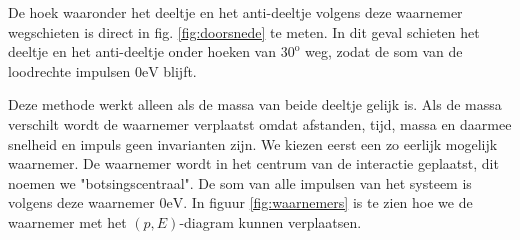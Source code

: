De hoek waaronder het deeltje en het anti-deeltje volgens deze waarnemer wegschieten is direct in fig. \ref{fig:doorsnede} te meten. In dit geval schieten het deeltje en het anti-deeltje onder hoeken van $30^{\mathrm{o}}$ weg, zodat de som van de loodrechte impulsen $0\mathrm{eV}$ blijft. 

Deze methode werkt alleen als de massa van beide deeltje gelijk is. Als de massa verschilt wordt de waarnemer verplaatst omdat afstanden, tijd, massa en daarmee snelheid en impuls geen invarianten zijn. We kiezen eerst een zo eerlijk mogelijk waarnemer. De waarnemer wordt in het centrum van de interactie geplaatst, dit noemen we "botsingscentraal". De som van alle impulsen van het systeem is volgens deze waarnemer $0\mathrm{eV}$. In figuur \ref{fig:waarnemers} is te zien hoe we de waarnemer met het $(p,E)$-diagram kunnen verplaatsen.

